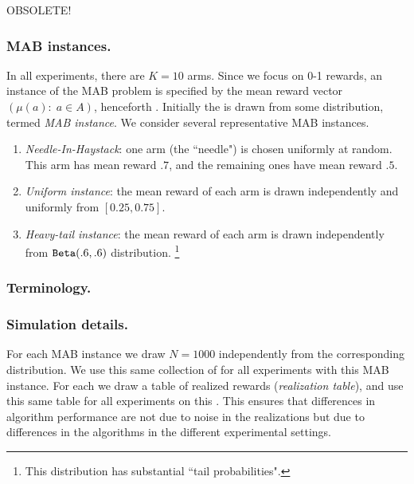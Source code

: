 \documentclass[../competing_bandits.tex]{subfiles}
\begin{document}
OBSOLETE!


\subsubsection{MAB instances.}
In all experiments, there are $K=10$ arms. Since we focus on 0-1 rewards, an instance of the MAB problem is specified by the mean reward vector $(\mu(a):\; a\in A)$, henceforth \MRV. Initially the \MRV is drawn from some distribution, termed \emph{MAB instance}. We consider several representative MAB instances.
\begin{enumerate}
\item \emph{Needle-In-Haystack}: one arm (the ``needle") is chosen uniformly at random. This arm has mean reward $.7$, and the remaining ones have mean reward $.5$.

\item \emph{Uniform instance}: the mean reward of each arm is drawn independently and uniformly from $[0.25, 0.75]$.
\item \emph{Heavy-tail instance}: the mean reward of each arm is drawn independently from $\mathtt{Beta}(.6,.6)$ distribution.%
    \footnote{This distribution has substantial ``tail probabilities".}
\end{enumerate}

\subsubsection{Terminology.}



\subsubsection{Simulation details.}
For each MAB instance we draw $N = 1000$ \MRVs independently from the corresponding distribution. We use this same collection of \MRVs for all experiments with this MAB instance. For each \MRV we draw a table of realized rewards (\emph{realization table}), and use this same table for all experiments on this \MRV. This ensures that differences in algorithm performance are not due to noise in the realizations but due to differences in the algorithms in the different experimental settings.
\end{document}
